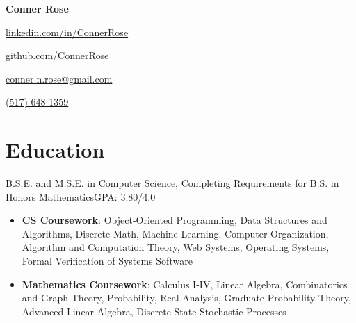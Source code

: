 \documentclass[letterpaper,11pt]{article}
\begin{document}
\begin{center}
    \Huge{\textbf{Conner Rose}} \\
    \begin{itemize*}
        \item[] \href{https://linkedin.com/in/ConnerRose}{linkedin.com/in/ConnerRose}
        \item \href{https://github.com/ConnerRose}{github.com/ConnerRose}
        \item \href{mailto:conner.n.rose@gmail.com}{conner.n.rose@gmail.com}
        \item \href{tel:+15176481359}{(517) 648-1359}
    \end{itemize*}
\end{center}

\section{Education}
{B.S.E. and M.S.E. in Computer Science, Completing Requirements for B.S. in
Honors Mathematics}{GPA: 3.80/4.0}
\begin{itemize}
    \item \textbf{CS Coursework}: Object-Oriented Programming, Data Structures
        and Algorithms, Discrete Math, Machine Learning, Computer
        Organization, Algorithm and Computation Theory,  Web Systems, Operating
        Systems, Formal Verification of Systems Software
    \item \textbf{Mathematics Coursework}: Calculus I-IV, Linear Algebra,
        Combinatorics and Graph Theory, Probability, Real Analysis, Graduate
        Probability Theory, Advanced Linear Algebra, Discrete State Stochastic
        Processes
\end{itemize}
\end{document}
